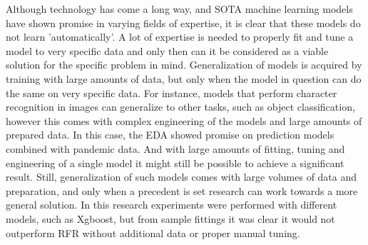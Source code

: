 Although technology has come a long way, and SOTA machine learning models have shown promise in varying fields of expertise, it is clear that these models do not learn 'automatically'. A lot of expertise is needed to properly fit and tune a model to very specific data and only then can it be considered as a viable solution for the specific problem in mind. Generalization of models is acquired by training with large amounts of data, but only when the model in question can do the same on very specific data. For instance, models that perform character recognition in images can generalize to other tasks, such as object classification, however this comes with complex engineering of the models and large amounts of prepared data. In this case, the EDA showed promise on prediction models combined with pandemic data. And with large amounts of fitting, tuning and engineering of a single model it might still be possible to achieve a significant result. Still, generalization of such models comes with large volumes of data and preparation, and only when a precedent is set research can work towards a more general solution. In this research experiments were performed with different models, such as Xgboost, but from sample fittings it was clear it would not outperform RFR without additional data or proper manual tuning.

